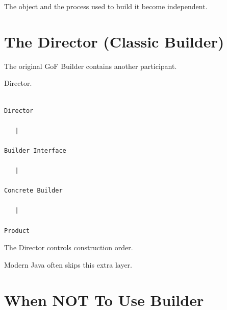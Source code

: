 \documentclass[11pt,a4paper]{book}
\begin{document}
The object and the process
used to build it become
independent.


\section{The Director (Classic Builder)}

The original GoF Builder
contains another participant.


Director.


\begin{verbatim}

Director

   |

Builder Interface

   |

Concrete Builder

   |

Product

\end{verbatim}


The Director controls
construction order.


Modern Java often skips this
extra layer.


\section{When NOT To Use Builder}
\end{document}
